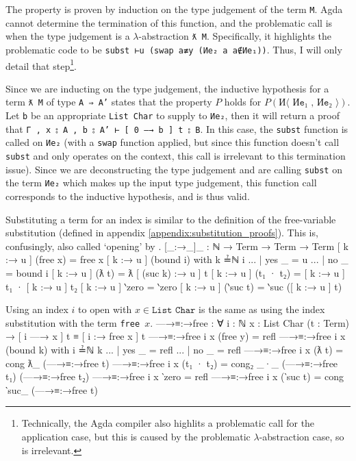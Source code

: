 \documentclass[logo,bsc,singlespacing,parskip,online]{infthesis}
\renewenvironment{code}{\mintedcopy[breaklines,breaksymbolleft=\;]{agda}}{\endmintedcopy}
\begin{document}
The property is proven by induction on the type judgement of the term \texttt{M}. Agda cannot
determine the termination of this function, and the problematic call is when the type judgement is a
$\lambda$-abstraction \texttt{ƛ M}. Specifically, it highlights the problematic code to be
\texttt{subst ⊢u (swap a≢y (Иe₂ a {a∉Иe₁}))}. Thus, I will only detail that
step\footnote{Technically, the Agda compiler also highlits a problematic call for the application
case, but this is caused by the problematic $\lambda$-abstraction case, so is irrelevant.}.

Since we are inducting on the type judgement, the inductive hypothesis for a term \texttt{ƛ M} of
type \texttt{A ⇒ A'} states that the property $P$ holds for $P(\texttt{И⟨ Иe₁ , Иe₂ ⟩})$. Let
\texttt{b} be an appropriate \texttt{List Char} to supply to \texttt{Иe₂}, then it will return a
proof that \texttt{Γ , x ⦂ A , b ⦂ A' ⊢ [ 0 —→ b ] t ⦂ B}. In this case, the \texttt{subst} function
is called on \texttt{Иe₂} (with a \texttt{swap} function applied, but since this function doesn't
call \texttt{subst} and only operates on the context, this call is irrelevant to this termination
issue). Since we are deconstructing the type judgement and are calling \texttt{subst} on the term
\texttt{Иe₂} which makes up the input type judgement, this function call corresponds to the
inductive hypothesis, and is thus valid.

Substituting a term for an index is similar to the definition of the free-variable substitution
(defined in appendix \ref{appendix:substitution_proofs}). This is, confusingly, also called
`opening' by \citet{chargueraud_locally_2012}.
\begin{code}
  [_:→_]_ : ℕ → Term → Term → Term
  [ k :→ u ] (free x) = free x
  [ k :→ u ] (bound i) with k ≟ℕ i
  ... | yes _ = u
  ... | no  _ = bound i
  [ k :→ u ] (ƛ t) = ƛ [ (suc k) :→ u ] t
  [ k :→ u ] (t₁ · t₂) = [ k :→ u ] t₁ · [ k :→ u ] t₂
  [ k :→ u ] ‵zero = ‵zero
  [ k :→ u ] (‵suc t) = ‵suc ([ k :→ u ] t)
\end{code}

Using an index $i$ to open with $x \in \texttt{List Char}$ is the same as using the index
substitution with the term \texttt{free $x$}.
\begin{code}
  —→≡:→free : ∀ {i : ℕ} {x : List Char} (t : Term)
    → [ i —→ x ] t ≡ [ i :→ free x ] t
  —→≡:→free {i} {x} (free y) = refl
  —→≡:→free {i} {x} (bound k) with i ≟ℕ k
  ... | yes _ = refl
  ... | no  _ = refl
  —→≡:→free {i} {x} (ƛ t) = cong ƛ_ (—→≡:→free t)
  —→≡:→free {i} {x} (t₁ · t₂) =
    cong₂ _·_ (—→≡:→free t₁) (—→≡:→free t₂)
  —→≡:→free {i} {x} ‵zero = refl
  —→≡:→free {i} {x} (‵suc t) = cong ‵suc_ (—→≡:→free t)
\end{code}
\end{document}
